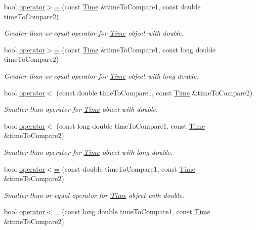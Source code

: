 \begin{DoxyCompactItemize}
bool \hyperlink{classtudat_1_1Time_a355a29cec48bc15fb58e420c0d225cfa}{operator$>$=} (const \hyperlink{classtudat_1_1Time}{Time} \&time\+To\+Compare1, const double time\+To\+Compare2)
\begin{DoxyCompactList}\small\item\em Greater-\/than-\/or-\/equal operator for \hyperlink{classtudat_1_1Time}{Time} object with double. \end{DoxyCompactList}\item 
bool \hyperlink{classtudat_1_1Time_a947f0a18e59f3503a284e55150ddde48}{operator$>$=} (const \hyperlink{classtudat_1_1Time}{Time} \&time\+To\+Compare1, const long double time\+To\+Compare2)
\begin{DoxyCompactList}\small\item\em Greater-\/than-\/or-\/equal operator for \hyperlink{classtudat_1_1Time}{Time} object with long double. \end{DoxyCompactList}\item 
bool \hyperlink{classtudat_1_1Time_a627d5807ead9b433124fb76bc6475258}{operator$<$} (const double time\+To\+Compare1, const \hyperlink{classtudat_1_1Time}{Time} \&time\+To\+Compare2)
\begin{DoxyCompactList}\small\item\em Smaller-\/than operator for \hyperlink{classtudat_1_1Time}{Time} object with double. \end{DoxyCompactList}\item 
bool \hyperlink{classtudat_1_1Time_a7d3cf444b5ef2a2a2121b5d63effd297}{operator$<$} (const long double time\+To\+Compare1, const \hyperlink{classtudat_1_1Time}{Time} \&time\+To\+Compare2)
\begin{DoxyCompactList}\small\item\em Smaller-\/than operator for \hyperlink{classtudat_1_1Time}{Time} object with long double. \end{DoxyCompactList}\item 
bool \hyperlink{classtudat_1_1Time_a77399f0e8c0e74db527e0b7f3a63a0e1}{operator$<$=} (const double time\+To\+Compare1, const \hyperlink{classtudat_1_1Time}{Time} \&time\+To\+Compare2)
\begin{DoxyCompactList}\small\item\em Smaller-\/than-\/or-\/equal operator for \hyperlink{classtudat_1_1Time}{Time} object with double. \end{DoxyCompactList}\item 
bool \hyperlink{classtudat_1_1Time_a78685d7cd0ceeeef5f3671eec6e22ab8}{operator$<$=} (const long double time\+To\+Compare1, const \hyperlink{classtudat_1_1Time}{Time} \&time\+To\+Compare2)

\end{DoxyCompactItemize}
